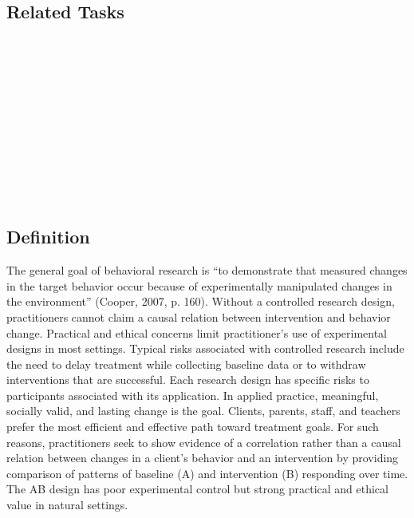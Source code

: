 \subsection{Related Tasks}
\fourgSix{}\\
\fourgEight{}\\
\fouriSix{}\\
\fourjFour{}\\
\fourjFive{}\\
\fourjSix{}\\
\fourjTwelve{}\\
\fourkTwo{}\\
\fourkThree{}\\
\fourkNine{}\\
%
%
%
%
%
%
%
%
\section[\fourjNine{}]{\fourjNine{}%
              }
\subsection{Definition}
The general goal of behavioral research is ``to demonstrate that measured changes in the target behavior occur because of experimentally manipulated changes in the environment'' (Cooper, 2007, p. 160). Without a controlled research design, practitioners cannot claim a causal relation between intervention and behavior change. Practical and ethical concerns limit practitioner's use of experimental designs in most settings. Typical risks associated with controlled research include the need to delay treatment while collecting baseline data or to withdraw interventions that are successful. Each research design has specific risks to participants associated with its application. In applied practice, meaningful, socially valid, and lasting change is the goal. Clients, parents, staff, and teachers prefer the most efficient and effective path toward treatment goals. For such reasons, practitioners seek to show evidence of a correlation rather than a causal relation between changes in a client's behavior and an intervention by providing comparison of patterns of baseline (A) and intervention (B) responding over time. The AB design has poor experimental control but strong practical and ethical value in natural settings.
%
